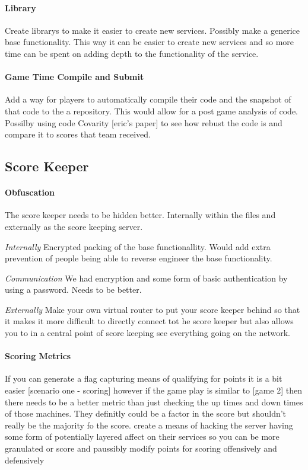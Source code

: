\documentclass[10pt]{article}
\begin{document}
\paragraph{Library}
Create librarys to make it easier to create new services. Possibly make a generice base
functionality. This way it can be easier to create new services and so more time can
be spent on adding depth to the functionality of the service.

\paragraph{Game Time Compile and Submit}
Add a way for players to automatically compile their code and the snapshot of that code
to the a repository. This would allow for a post game analysis of code. Possilby using
code Covarity [eric's paper] to see how rebust the code is and compare it to scores
that team received.

\subsection{Score Keeper}

\paragraph{Obfuscation}
The score keeper needs to be hidden better. Internally within the files and externally
as the score keeping server.

\textit{Internally}
Encrypted packing of the base functionallity. Would add extra prevention of people being
able to reverse engineer the base functionality.

\textit{Communication}
We had encryption and some form of basic authentication by using a password.
Needs to be better.

\textit{Externally}
Make your own virtual router to put your score keeper behind so that it makes it
more difficult to directly connect tot he score keeper but also allows you to in a central
point of score keeping see everything going on the network.

\paragraph{Scoring Metrics}
If you can generate a flag capturing means of qualifying for points it is a bit easier
[scenario one - scoring] however if the game play is similar to [game 2] then there
needs to be a better metric than just checking the up times and down times of those machines.
They definitly could be a factor in the score but shouldn't really be the majority fo the score.
create a means of hacking the server having some form of potentially layered affect on their
services so you can be more granulated or score and paussibly modify points for scoring
offensively and defensively
\end{document}
